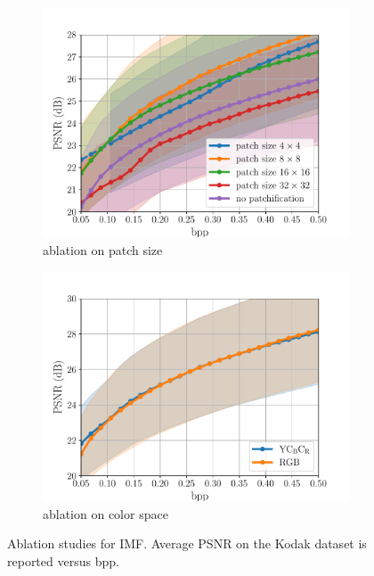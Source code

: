 \begin{figure}[t]
	\centering
	\begin{subfigure}{.45\textwidth}
		\centering
		\includegraphics[width=.95\textwidth]{figures/ablation_patchsize_psnr.pdf}
		\caption{ablation on patch size}
		\label{fig: patch ablation psnr-vs-bpp}
	\end{subfigure}
    \begin{subfigure}{.45\textwidth}
		\centering
		\includegraphics[width=.95\textwidth]{figures/ablation_colorspace_psnr.pdf}
		\caption{ablation on color space}
		\label{fig: colorspace ablation psnr-vs-bpp}
	\end{subfigure}%
	\caption{Ablation studies for IMF. Average PSNR on the Kodak dataset is reported versus bpp. 
    }
	\label{fig: ablation studies: appen}
\end{figure}

